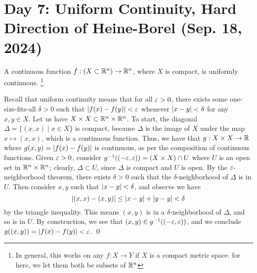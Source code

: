 \section{Day 7: Uniform Continuity, Hard Direction of Heine-Borel (Sep. 18, 2024)}
\begin{simplethm}
    A continuous function $f : (X \subset \mathbb R^n) \to \mathbb R^n$, where $X$ is compact, is uniformly continuous. \footnote{In general, this works on any $f : X \to Y$ if $X$ is a compact metric space. for here, we let them both be subsets of $\mathbb R^n$}
\end{simplethm}
\noindent Recall that uniform continuity means that for all $\varepsilon > 0$, there exists some one-size-fits-all $\delta > 0$ such that $\left\lvert f(x) - f(y) \right\rvert < \varepsilon$ whenever $\left\lvert x - y \right\rvert < \delta$ for any $x, y \in X$.
\medskip\newline
\noindent Let us have $X \times X \subset \mathbb R^n \times \mathbb R^n$. To start, the diagonal $\Delta = \{(x, x) \mid x \in X\}$ is compact, because $\Delta$ is the image of $X$ under the map $x \mapsto (x, x)$, which is a continuous function. Thus, we have that $g : X \times X \to \mathbb R$ where $g(x, y) = \left\lvert f(x) - f(y) \right\rvert$ is continuous, as per the composition of continuous functions.
\medskip\newline
Given $\varepsilon > 0$, consider $g^{-1}((-\varepsilon, \varepsilon)) = (X \times X) \cap U$ where $U$ is an open set in $\mathbb R^n \times \mathbb R^n$; clearly, $\Delta \subset U$, since $\Delta$ is compact and $U$ is open. By the $\varepsilon$-neighborhood theorem, there exists $\delta > 0$ such that the $\delta$-neighborhood of $\Delta$ is in $U$. Then consider $x, y$ such that $\left\lvert x - y \right\rvert < \delta$, and observe we have
\[ \left\lvert (x, x) - (x, y) \right\rvert \leq \left\lvert x - y \right\rvert + \left\lvert y - y \right\rvert < \delta \]
by the triangle inequality. This means $(x, y)$ is in a $\delta$-neighborhood of $\Delta$, and so is in $U$. By construction, we see that $(x, y) \in g^{-1}((-\varepsilon, \varepsilon))$, and we conclude $g((x, y)) = \left\lvert f(x) - f(y) \right\rvert < \varepsilon$. \qed

